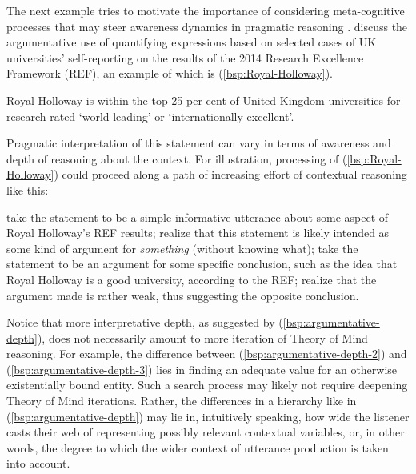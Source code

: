 \documentclass[fleqn,reqno,12pt]{article}
\begin{document}
The next example tries to motivate the importance of considering meta-cognitive processes that may steer awareness dynamics in pragmatic reasoning \citep[see][]{Allott2020:Metacognition-a}.
\citet{CumminsFranke2021:Rational-interp} discuss the argumentative use of quantifying expressions based on selected cases of UK universities' self-reporting on the results of the 2014 Research Excellence Framework (REF), an example of which is (\ref{bsp:Royal-Holloway}).
\begin{exe}
  \ex \label{bsp:Royal-Holloway}
  Royal Holloway is within the top 25 per cent of United Kingdom universities for research rated ‘world-leading’ or ‘internationally excellent’.
\end{exe}
Pragmatic interpretation of this statement can vary in terms of awareness and depth of reasoning about the context.
For illustration, processing of (\ref{bsp:Royal-Holloway}) could proceed along a path of increasing effort of contextual reasoning like this:
%
\begin{exe}
  \ex \label{bsp:argumentative-depth}
  \begin{xlist}
    \ex take the statement to be a simple informative utterance about some aspect of Royal Holloway's REF results;
    \label{bsp:argumentative-depth-1}
    \ex realize that this statement is likely intended as some kind of argument for \emph{something} (without knowing what);
    \label{bsp:argumentative-depth-2}
    \ex take the statement to be an argument for some specific conclusion, such as the idea that Royal Holloway is a good university, according to the REF;
    \label{bsp:argumentative-depth-3}
    \ex realize that the argument made is rather weak, thus suggesting the opposite conclusion.
    \label{bsp:argumentative-depth-4}
  \end{xlist}
\end{exe}
%
Notice that more interpretative depth, as suggested by (\ref{bsp:argumentative-depth}), does not necessarily amount to more iteration of Theory of Mind reasoning.
For example, the difference between (\ref{bsp:argumentative-depth-2}) and (\ref{bsp:argumentative-depth-3}) lies in finding an adequate value for an otherwise existentially bound entity.
Such a search process may likely not require deepening Theory of Mind iterations.
Rather, the differences in a hierarchy like in (\ref{bsp:argumentative-depth}) may lie in, intuitively speaking, how wide the listener casts their web of representing possibly relevant contextual variables, or, in other words, the degree to which the wider context of utterance production is taken into account.
\end{document}
